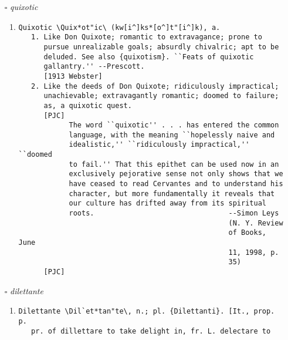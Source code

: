 \documentclass{article}
\begin{document}
\begin{itemize}
\begin{enumerate}
{\begin{lstlisting}
        [1913 Webster]
Respite \Res"pite\, v. t. [imp. & p. p. {Respited}; p. pr. & vb.
   n. {Respiting}.] [OF. respiter, LL. respectare. See
   {Respite}, n.]
   To give or grant a respite to. Specifically:
   (a) To delay or postpone; to put off.
   (b) To keep back from execution; to reprieve.
       [1913 Webster]
             Forty days longer we do respite you. --Shak.
       [1913 Webster]
   (c) To relieve by a pause or interval of rest. ``To respite
       his day labor with repast.'' --Milton.
       [1913 Webster]
\end{lstlisting}}
\end{enumerate}
\item[$\square$] \emph{ quixotic }
\begin{enumerate}
\item{
\begin{lstlisting}
Quixotic \Quix*ot"ic\ (kw[i^]ks*[o^]t"[i^]k), a.
   1. Like Don Quixote; romantic to extravagance; prone to
      pursue unrealizable goals; absurdly chivalric; apt to be
      deluded. See also {quixotism}. ``Feats of quixotic
      gallantry.'' --Prescott.
      [1913 Webster]
   2. Like the deeds of Don Quixote; ridiculously impractical;
      unachievable; extravagantly romantic; doomed to failure;
      as, a quixotic quest.
      [PJC]
            The word ``quixotic'' . . . has entered the common
            language, with the meaning ``hopelessly naive and
            idealistic,'' ``ridiculously impractical,'' ``doomed
            to fail.'' That this epithet can be used now in an
            exclusively pejorative sense not only shows that we
            have ceased to read Cervantes and to understand his
            character, but more fundamentally it reveals that
            our culture has drifted away from its spiritual
            roots.                                --Simon Leys
                                                  (N. Y. Review
                                                  of Books, June
                                                  11, 1998, p.
                                                  35)
      [PJC]
\end{lstlisting}}
\end{enumerate}
\item[$\square$] \emph{ dilettante }
\begin{enumerate}
\item{
\begin{lstlisting}
Dilettante \Dil`et*tan"te\, n.; pl. {Dilettanti}. [It., prop. p.
   pr. of dillettare to take delight in, fr. L. delectare to

\end{lstlisting}}
\end{enumerate}
\end{itemize}
\end{document}
